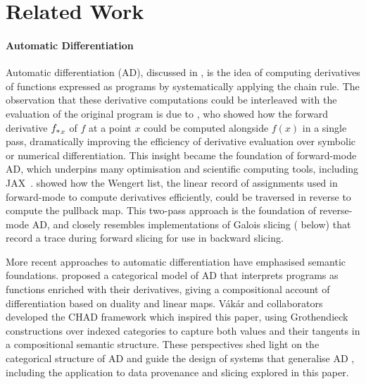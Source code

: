 \section{Related Work}
\label{sec:related-work}

\paragraph{Automatic Differentiation}

Automatic differentiation (AD), discussed in , is the idea of computing
derivatives of functions expressed as programs by systematically applying the chain rule. The observation that
these derivative computations could be interleaved with the evaluation of the original program is due to
\citet{linnainmaa76}, who showed how the forward derivative ${f_{*}}_x$ of $f$ at a point $x$ could be
computed alongside $f(x)$ in a single pass, dramatically improving the efficiency of derivative evaluation
over symbolic or numerical differentiation. This insight became the foundation of forward-mode AD, which
underpins many optimisation and scientific computing tools, including JAX~\cite{jax2018github}.
\citet{griewank89} showed how the Wengert list, the linear record of assignments used in forward-mode to
compute derivatives efficiently, could be traversed in reverse to compute the pullback map. This two-pass
approach is the foundation of reverse-mode AD, and closely resembles implementations of Galois slicing
( below) that record a trace during forward slicing for use in backward
slicing.

More recent approaches to automatic differentiation have emphasised semantic foundations. \citet{elliott18}
proposed a categorical model of AD that interprets programs as functions enriched with their derivatives,
giving a compositional account of differentiation based on duality and linear maps. Vákár and
collaborators~\cite{vakar22,nunes2023} developed the CHAD framework which inspired this paper, using
Grothendieck constructions over indexed categories to capture both values and their tangents in a
compositional semantic structure. These perspectives shed light on the categorical structure of AD and guide
the design of systems that generalise AD%
, including the application to data provenance
and slicing explored in this paper.

\paragraph{\GPS}
\label{sec:related-work:galois-slicing}

